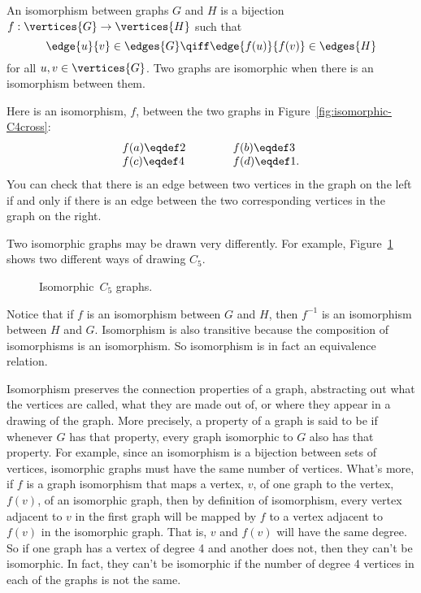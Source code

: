 \begin{definition}\label{simple-isomorphism}
An isomorphism between graphs $G$ and $H$ is a bijection
$f:\vertices{G} \to \vertices{H}$ such that
\[
\edge{u}{v} \in \edges{G} \qiff \edge{f(u)}{f(v)} \in \edges{H}
\]
for all $u, v \in \vertices{G}$.  Two graphs are isomorphic when there
is an isomorphism between them.
\end{definition}

Here is an isomorphism, $f$, between the two graphs in
Figure~\ref{fig:isomorphic-C4cross}:
\[
\begin{array}{lll}
f(a) \eqdef 2 & \hspace{0.3in} & f(b) \eqdef 3 \\
f(c) \eqdef 4 & & f(d) \eqdef 1.
\end{array}
\]
You can check that there is an edge between two vertices in the graph on the left if
and only if there is an edge between the two corresponding vertices in the graph on the
right.

Two isomorphic graphs may be drawn very differently.  For example,
Figure~\ref{fig:isomorphic-C5s} shows two different ways of drawing
$C_5$.
\begin{figure}


\caption{Isomorphic~$C_5$ graphs.}
\label{fig:isomorphic-C5s}
\end{figure}

Notice that if $f$ is an isomorphism between $G$ and $H$, then $f^{-1}$
is an isomorphism between $H$ and $G$.  Isomorphism is also transitive
because the composition of isomorphisms is an isomorphism.  So
isomorphism is in fact an equivalence relation.

Isomorphism preserves the connection properties of a graph,
abstracting out what the vertices are called, what they are made out
of, or where they appear in a drawing of the graph.  More precisely, a
property of a graph is said to be 
if whenever $G$ has that property, every graph isomorphic to $G$ also
has that property.  For example, since an isomorphism is a bijection
between sets of vertices, isomorphic graphs must have the same number
of vertices.  What's more, if $f$ is a graph isomorphism that maps a
vertex, $v$, of one graph to the vertex, $f(v)$, of an isomorphic
graph, then by definition of isomorphism, every vertex adjacent to $v$
in the first graph will be mapped by $f$ to a vertex adjacent to
$f(v)$ in the isomorphic graph.  That is, $v$ and $f(v)$ will have the
same degree.  So if one graph has a vertex of degree 4 and another
does not, then they can't be isomorphic.  In fact, they can't be
isomorphic if the number of degree 4 vertices in each of the graphs is
not the same.

